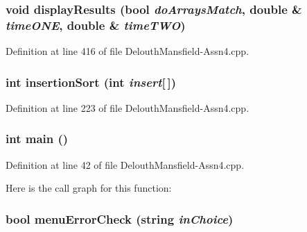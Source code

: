 \hypertarget{_delouth_mansfield-_assn4_8cpp_a95da63b4a266243c36e025d0fcc6b757}{
\subsubsection[{displayResults}]{\setlength{\rightskip}{0pt plus 5cm}void displayResults (bool {\em doArraysMatch}, \/  double \& {\em timeONE}, \/  double \& {\em timeTWO})}}
\label{_delouth_mansfield-_assn4_8cpp_a95da63b4a266243c36e025d0fcc6b757}


Definition at line 416 of file DelouthMansfield-\/Assn4.cpp.

\hypertarget{_delouth_mansfield-_assn4_8cpp_abdd451b9bf57eb321b817db4405d65fd}{
\subsubsection[{insertionSort}]{\setlength{\rightskip}{0pt plus 5cm}int insertionSort (int {\em insert}\mbox{[}$\,$\mbox{]})}}
\label{_delouth_mansfield-_assn4_8cpp_abdd451b9bf57eb321b817db4405d65fd}


Definition at line 223 of file DelouthMansfield-\/Assn4.cpp.

\hypertarget{_delouth_mansfield-_assn4_8cpp_ae66f6b31b5ad750f1fe042a706a4e3d4}{
\subsubsection[{main}]{\setlength{\rightskip}{0pt plus 5cm}int main ()}}
\label{_delouth_mansfield-_assn4_8cpp_ae66f6b31b5ad750f1fe042a706a4e3d4}


Definition at line 42 of file DelouthMansfield-\/Assn4.cpp.



Here is the call graph for this function:

\hypertarget{_delouth_mansfield-_assn4_8cpp_a3fcd92b059e256a9f46866c6d1e2b1e4}{
\subsubsection[{menuErrorCheck}]{\setlength{\rightskip}{0pt plus 5cm}bool menuErrorCheck (string {\em inChoice})}}
\label{_delouth_mansfield-_assn4_8cpp_a3fcd92b059e256a9f46866c6d1e2b1e4}


